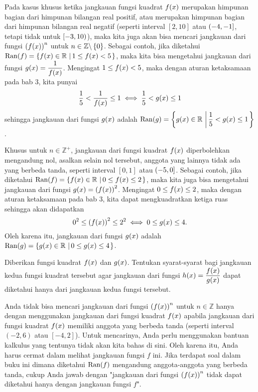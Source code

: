 	\par Pada kasus khusus ketika jangkauan fungsi kuadrat $ \mathop{}\!{f}{\left({x}\right)} $ merupakan himpunan bagian dari himpunan bilangan real positif, atau merupakan himpunan bagian dari himpunan bilangan real negatif (seperti interval $ \left[2, 10\right] $ atau $ \mathop{}\!\left({-4, -1}\right] $, tetapi tidak untuk $ \mathop{}\!\left[{-3, 10}\right) $), maka kita juga akan bisa mencari jangkauan dari fungsi $ \left(\mathop{}\!{f}{\left({x}\right)}\right)^{n} $ untuk $ n \in \mathbb{Z} \backslash \mathop{}\!\left\lbrace0\right\rbrace $. Sebagai contoh, jika diketahui $ \mathop{}\!{\operatorname{Ran}}{\left({f}\right)} = \mathop{}\!\left\lbrace{{\mathop{}\!{f}{\left({x}\right)} \in \mathbb{R}} \, \left|\, {1 \leq \mathop{}\!{f}{\left({x}\right)} < 5}\right.}\right\rbrace $, maka kita bisa mengetahui jangkauan dari fungsi $ \mathop{}\!{g}{\left({x}\right)} = \dfrac{1}{\mathop{}\!{f}{\left({x}\right)}} $. Mengingat $ 1 \leq \mathop{}\!{f}{\left({x}\right)} < 5 $, maka dengan aturan ketaksamaan pada bab 3, kita punyai
	\[ \frac{1}{5} < \frac{1}{\mathop{}\!{f}{\left({x}\right)}} \leq 1 \iff \frac{1}{5} < \mathop{}\!{g}{\left({x}\right)} \leq 1 \]
	sehingga jangkauan dari fungsi $ \mathop{}\!{g}{\left({x}\right)} $ adalah $ \mathop{}\!{\operatorname{Ran}}{\left({g}\right)} = \mathop{}\!\left\lbrace{{\mathop{}\!{g}{\left({x}\right)} \in \mathbb{R}} \, \left|\, {\dfrac{1}{5} < \mathop{}\!{g}{\left({x}\right)} \leq 1}\right.}\right\rbrace $.
	
	\par Khusus untuk $ n \in \mathbb{Z}^{+} $, jangkauan dari fungsi kuadrat $ \mathop{}\!{f}{\left({x}\right)} $ diperbolehkan mengandung nol, asalkan selain nol tersebut, anggota yang lainnya tidak ada yang berbeda tanda, seperti interval $ \left[0, 1\right] $ atau $ \mathop{}\!\left({-5, 0}\right] $. Sebagai contoh, jika diketahui $ \mathop{}\!{\operatorname{Ran}}{\left({f}\right)} = \mathop{}\!\left\lbrace{{\mathop{}\!{f}{\left({x}\right)} \in \mathbb{R}} \, \left|\, {0 \leq \mathop{}\!{f}{\left({x}\right)} \leq 2}\right.}\right\rbrace $, maka kita juga bisa mengetahui jangkauan dari fungsi $ \mathop{}\!{g}{\left({x}\right)} = \left(\mathop{}\!{f}{\left({x}\right)}\right)^{2} $. Mengingat $ 0 \leq \mathop{}\!{f}{\left({x}\right)} \leq 2 $, maka dengan aturan ketaksamaan pada bab 3, kita dapat mengkuadratkan ketiga ruas sehingga akan didapatkan
	\[ 0^{2} \leq \left(\mathop{}\!{f}{\left({x}\right)}\right)^{2} \leq 2^{2} \iff 0 \leq \mathop{}\!{g}{\left({x}\right)} \leq 4. \]
	Oleh karena itu, jangkauan dari fungsi $ \mathop{}\!{g}{\left({x}\right)} $ adalah $ \mathop{}\!{\operatorname{Ran}}{\left({g}\right)} = \mathop{}\!\left\lbrace{{\mathop{}\!{g}{\left({x}\right)} \in \mathbb{R}} \, \left|\, {0 \leq \mathop{}\!{g}{\left({x}\right)} \leq 4}\right.}\right\rbrace $.
	
	\begin{explbox}
		Diberikan fungsi kuadrat $ \mathop{}\!{f}{\left({x}\right)} $ dan $ \mathop{}\!{g}{\left({x}\right)} $. Tentukan syarat-syarat bagi jangkauan kedua fungsi kuadrat tersebut agar jangkauan dari fungsi $ \mathop{}\!{h}{\left({x}\right)} = \dfrac{\mathop{}\!{f}{\left({x}\right)}}{\mathop{}\!{g}{\left({x}\right)}} $ dapat diketahui hanya dari jangkauan kedua fungsi tersebut.
	\end{explbox}
	
	\par Anda tidak bisa mencari jangkauan dari fungsi $ \left(\mathop{}\!{f}{\left({x}\right)}\right)^{n} $ untuk $ n \in \mathbb{Z} $ hanya dengan menggunakan jangkauan dari fungsi kuadrat $ \mathop{}\!{f}{\left({x}\right)} $ apabila jangkauan dari fungsi kuadrat $ \mathop{}\!{f}{\left({x}\right)} $ memiliki anggota yang berbeda tanda (seperti interval $ \left(-2, 6\right) $ atau $ \left[-4, 2\right] $). Untuk mencarinya, Anda perlu menggunakan bantuan kalkulus yang tentunya tidak akan kita bahas di sini. Oleh karena itu, Anda harus cermat dalam melihat jangkauan fungsi $ f $ ini. Jika terdapat soal dalam buku ini dimana diketahui $ \mathop{}\!{\operatorname{Ran}}{\left({f}\right)} $ mengandung anggota-anggota yang berbeda tanda, cukup Anda jawab dengan "jangkauan dari fungsi $ \left(\mathop{}\!{f}{\left({x}\right)}\right)^{n} $ tidak dapat diketahui hanya dengan jangkauan fungsi $ f $".
	
